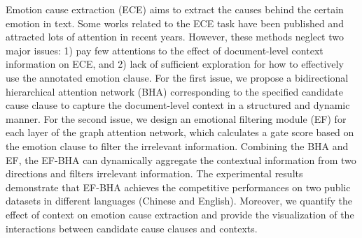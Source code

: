 Emotion cause extraction (ECE) aims to extract the causes behind the certain emotion in text. Some works related to the ECE task have been published and attracted lots of attention in recent years. However, these methods neglect two major issues: 1) pay few attentions to the effect of document-level context information on ECE, and 2) lack of sufficient exploration for how to effectively use the annotated emotion clause. For the first issue, we propose a bidirectional hierarchical attention network (BHA) corresponding to the specified candidate cause clause to capture the document-level context in a structured and dynamic manner. For the second issue, we design an emotional filtering module (EF) for each layer of the graph attention network, which calculates a gate score based on the emotion clause to filter the irrelevant information. Combining the BHA and EF, the EF-BHA can dynamically aggregate the contextual information from two directions and filters irrelevant information. The experimental results demonstrate that EF-BHA achieves the competitive performances on two public datasets in different languages (Chinese and English). Moreover, we quantify the effect of context on emotion cause extraction and provide the visualization of the interactions between candidate cause clauses and contexts.
